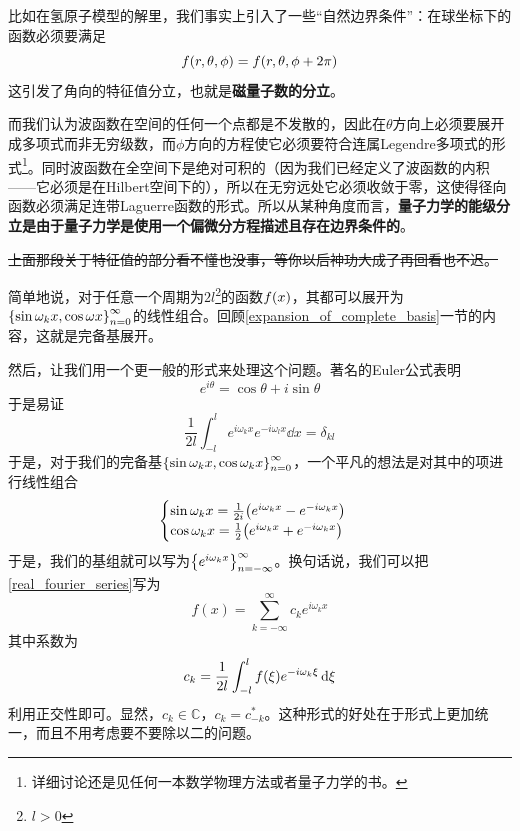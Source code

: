 \documentclass[12pt,a4paper,openany,twoside]{book}
\numberwithin{equation}{section}
\begin{document}
    比如在氢原子模型的解里，我们事实上引入了一些“自然边界条件”：在球坐标下的函数必须要满足
    \begin{equation}
      f\qty(r,\theta, \phi)=f\qty(r,\theta,\phi+2\pi)
    \end{equation}
    这引发了角向的特征值分立，也就是\textbf{磁量子数的分立}。

    而我们认为波函数在空间的任何一个点都是不发散的，因此在$\theta$方向上必须要展开成多项式而非无穷级数，而$\phi$方向的方程使它必须要符合连属Legendre多项式的形式\footnote{详细讨论还是见任何一本数学物理方法或者量子力学的书。}。同时波函数在全空间下是绝对可积的（因为我们已经定义了波函数的内积——它必须是在Hilbert空间下的），所以在无穷远处它必须收敛于零，这使得径向函数必须满足连带Laguerre函数的形式。所以从某种角度而言，\textbf{量子力学的能级分立是由于量子力学是使用一个偏微分方程描述且存在边界条件的}。

    \sout{上面那段关于特征值的部分看不懂也没事，等你以后神功大成了再回看也不迟。}
    
    简单地说，对于任意一个周期为$2l$\footnote{$l>0$}的函数$f\qty(x)$，其都可以展开为$\qty{\sin{\omega_k x},\cos{\omega x}}_{n=0}^\infty$的线性组合。回顾\ref{expansion_of_complete_basis}一节的内容，这就是完备基展开。

    然后，让我们用一个更一般的形式来处理这个问题。著名的Euler公式表明
    \begin{equation}
      e^{i\theta}=\cos\theta+i\sin\theta
    \end{equation}
    于是易证
    \begin{equation}
      \frac{1}{2l}\int_{-l}^l{e^{i\omega_k x}e^{-i\omega_l x}\dd{x}}=\delta_{kl}
    \end{equation}
    于是，对于我们的完备基$\qty{\sin{\omega_k x},\cos{\omega_k x}}_{n=0}^\infty$，一个平凡的想法是对其中的项进行线性组合
    \begin{equation}
      \begin{cases}
        \sin{\omega_k x}=\frac{1}{2i}\qty(e^{i\omega_k x}-e^{-i\omega_k x})\\
        \cos{\omega_k x}=\frac{1}{2}\qty(e^{i\omega_k x}+e^{-i\omega_k x})
      \end{cases}
    \end{equation}
    于是，我们的基组就可以写为$\qty{e^{i\omega_k x}}_{n=-\infty}^\infty$。换句话说，我们可以把\ref{real_fourier_series}写为
    \begin{equation}
      f(x) = \sum_{k=-\infty}^{\infty}{c_k e^{i\omega_k x}}
    \end{equation}
    其中系数为
    \begin{equation}
      c_k=\frac{1}{2l}\int_{-l}^l{f\qty(\xi)e^{-i\omega_k\xi}\dd{\xi}}
    \end{equation}
    利用正交性即可。显然，$c_k\in\mathbb{C}$，$c_k=c_{-k}^*$。这种形式的好处在于形式上更加统一，而且不用考虑要不要除以二的问题。
\end{document}

